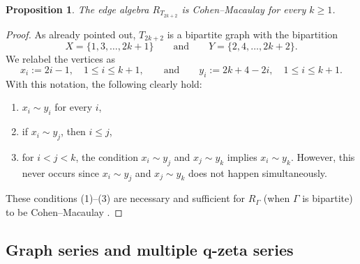 \documentclass[pdftex]{sigma}
\numberwithin{equation}{section}
\newtheorem{Proposition}[Theorem]{Proposition}
\theoremstyle{definition}
\begin{document}
\begin{Proposition} \label{CM} The edge algebra $R_{T_{2k+2}}$ is Cohen--Macaulay for every $k \geq 1$.
\end{Proposition}
\begin{proof}
As already pointed out, $T_{2k+2}$ is a bipartite graph with the bipartition
\[
X = \{1, 3, \dots, 2k+1\} \qquad \text{and} \qquad Y = \{2, 4, \dots, 2k+2\}.
\]
We relabel the vertices as
\[
x_i := 2i - 1, \quad 1 \leq i \leq k+1,
\qquad \text{and} \qquad
y_i := 2k + 4 - 2i, \quad 1 \leq i \leq k+1.
\]
With this notation, the following clearly hold:
\begin{enumerate}\itemsep=0pt
 \item[(1)] $x_i \sim y_i$ for every $i$,
 \item[(2)] if $x_i \sim y_j$, then $i \leq j$,
 \item[(3)] for $i < j < k$, the condition $x_i \sim y_j$ and $x_j \sim y_k$ implies $x_i \sim y_k$. However, this never occurs since $x_i \sim y_j$ and $x_j \sim y_k$ does not happen simultaneously.
\end{enumerate}
These conditions (1)--(3) are necessary and sufficient for $R_\Gamma$ (when $\Gamma$ is bipartite) to be Cohen--Macaulay \cite[Theorem~3.4]{CM}.
\end{proof}

\subsection[Graph series and multiple q-zeta series]{Graph series and multiple $\boldsymbol{q}$-zeta series}\label{section2.4}
\end{document}
